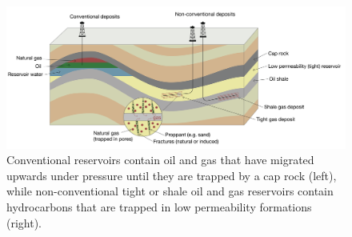 \begin{figure}
    \begin{center}
    \includegraphics[width=\textwidth]{figures/intro/nonconventional_resources.png}
    \end{center}
\caption{
    Conventional reservoirs contain oil and gas that have migrated upwards
    under pressure until they are trapped by a cap rock (left), while
    non-conventional tight or shale oil and gas reservoirs contain hydrocarbons
    that are trapped in low permeability formations (right).
}
\label{fig:nonconventional_resources}
\end{figure}
